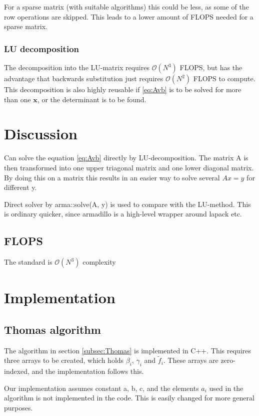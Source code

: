 \documentclass[11pt,a4paper,english,final]{article}
\numberwithin{equation}{section}
\newcommand{\ve}[1]{\mathbf{#1}} %
\newcommand{\bigO}[1]{\mathcal{O}\left( #1 \right)}
\begin{document}
For a sparse matrix (with suitable algorithms) this could be less, 
as some of the row operations are
skipped. This leads to a lower amount of FLOPS needed for a sparse
matrix.

\subsubsection{LU decomposition}
The decomposition into the LU-matrix requires $\bigO{N^3}$ FLOPS, but 
has the advantage that backwards substitution just requires $\bigO{N^2}$
FLOPS to compute. This decomposition is also highly reusable if \eqref{eq:Avb}
is to be solved for more than one $\ve{x}$, or the determinant is to be found.

\section{Discussion}

Can solve the equation \eqref{eq:Avb} directly by LU-decomposition.
The matrix A is then transformed into one upper triagonal matrix and
one lower diagonal matrix. By doing this on a matrix this results in an
easier way to solve several $Ax = y$ for different y.

Direct solver by arma::solve(A, y) is used to compare with the LU-method.
This is ordinary quicker, since armadillo is a high-level wrapper around
lapack etc.

\subsection{FLOPS}
The standard is $\bigO{N^3}$ complexity


\section{Implementation}

\subsection{Thomas algorithm}

The algorithm in section \ref{subsec:Thomas} is implemented in C++.
This requires three arrays to be created, which holds $\beta_i$, $\gamma_i$
and $\tilde{f}_i$. These arrays are zero-indexed, and the implementation
follows this.

Our implementation assumes constant a, b, c, and the elements $a_i$
used in the algorithm is not implemented in the code. This is 
easily changed for more general purposes.
\end{document}
